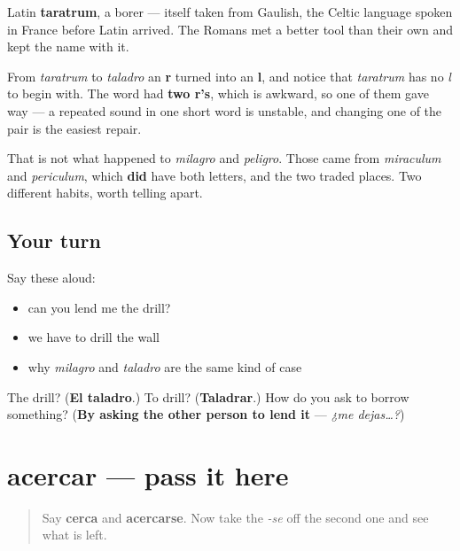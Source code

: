 \begin{cousinweb}
Latin \textbf{taratrum}, a borer — itself taken from Gaulish, the Celtic language spoken in France before Latin arrived. The Romans met a better tool than their own and kept the name with it.

From \emph{taratrum} to \emph{taladro} an \textbf{r} turned into an \textbf{l}, and notice that \emph{taratrum} has no \emph{l} to begin with. The word had \textbf{two r's}, which is awkward, so one of them gave way — a repeated sound in one short word is unstable, and changing one of the pair is the easiest repair.

That is not what happened to \emph{milagro} and \emph{peligro}. Those came from \emph{miraculum} and \emph{periculum}, which \textbf{did} have both letters, and the two traded places. Two different habits, worth telling apart.
\end{cousinweb}

\subsection*{Your turn}
Say these aloud:

\begin{itemize}
\raggedright
  \item can you lend me the drill?
  \item we have to drill the wall
  \item why \emph{milagro} and \emph{taladro} are the same kind of case
\end{itemize}

\begin{tcolorbox}[breakable,colback=teal!4,colframe=teal!35!black,title={Before you move on}]
The drill? (\textbf{El taladro}.) To drill? (\textbf{Taladrar}.) How do you ask to borrow something? (\textbf{By asking the other person to lend it} — \emph{¿me dejas…?})
\end{tcolorbox}
\section[acercar]{acercar — pass it here}

\label{lesson:ES-C449-acercar}



\begin{quote}
Say \textbf{cerca} and \textbf{acercarse}. Now take the \emph{-se} off the second one and see what is left.
\end{quote}

